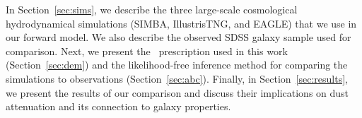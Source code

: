
In Section~\ref{sec:sims}, we describe the three large-scale cosmological
hydrodynamical simulations (SIMBA, IllustrisTNG, and EAGLE) that we use in
our forward model.
We also describe the observed SDSS galaxy sample used for comparison. 
Next, we present the \eda~prescription used in this work
(Section~\ref{sec:dem}) and the likelihood-free inference method for
comparing the simulations to observations (Section~\ref{sec:abc}). 
Finally, in Section~\ref{sec:results}, we present the results of our
comparison and discuss their implications on dust attenuation and its
connection to galaxy properties. 



